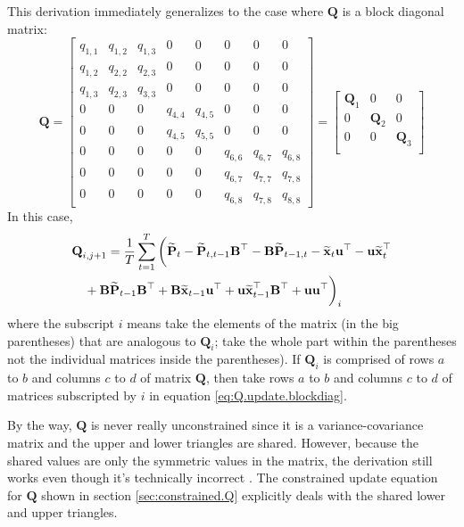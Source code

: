 \documentclass[]{article}
\def\BB{\mbox{$\mathbf B$}}	\def\bb{\mbox{$\mathbf b$}}
\def\PP{\mbox{$\mathbf P$}}  \def\pp{\mbox{$\mathbf p$}}
\def\QQ{\mbox{$\mathbf Q$}}	 \def\qq{\mbox{$\mathbf q$}}
\def\hatxt{\widetilde{\mbox{$\mathbf x$}}_t}
\def\hatxtm{\widetilde{\mbox{$\mathbf x$}}_{t-1}}
\def\hatPt{\widetilde{\PP}_t}
\def\hatPtm{\widetilde{\PP}_{t-1}}
\def\hatPttm{\widetilde{\PP}_{t,t-1}}
\def\hatPtmt{\widetilde{\PP}_{t-1,t}}
\begin{document}
This derivation immediately generalizes to the case where $\QQ$ is a block diagonal matrix:
\begin{equation*}
\QQ =
\begin{bmatrix}
q_{1,1}&q_{1,2}&q_{1,3}&0&0&0&0&0\\
q_{1,2}&q_{2,2}&q_{2,3}&0&0&0&0&0\\
q_{1,3}&q_{2,3}&q_{3,3}&0&0&0&0&0\\
0&0&0&q_{4,4}&q_{4,5}&0&0&0\\
0&0&0&q_{4,5}&q_{5,5}&0&0&0\\
0&0&0&0&0&q_{6,6}&q_{6,7}&q_{6,8}\\
0&0&0&0&0&q_{6,7}&q_{7,7}&q_{7,8}\\
0&0&0&0&0&q_{6,8}&q_{7,8}&q_{8,8}
\end{bmatrix}
=
\begin{bmatrix}
\QQ_1&0&0\\
0&\QQ_2&0\\
0&0&\QQ_3\\
\end{bmatrix}
\end{equation*}
In this case,
\begin{equation}\label{eq:Q.update.blockdiag}
\begin{split}
&\QQ_{i,j+1} = \frac{1}{T}\sum_{t=1}^T \bigg(  
 \hatPt - \hatPttm \BB^\top - \BB\hatPtmt 
 - \hatxt\uu^\top - \uu \hatxt^\top \\
&\quad + \BB\hatPtm\BB^\top + \BB\hatxtm\uu^\top + \uu\hatxtm^\top\BB^\top 
 + \uu\uu^\top \bigg)_i
\end{split}
\end{equation}
where the subscript $i$ means take the elements of the matrix (in the big parentheses) that are analogous to $\QQ_i$; take the whole part within the parentheses not the individual matrices inside the parentheses).  If $\QQ_i$ is comprised of rows $a$ to $b$ and columns $c$ to $d$ of matrix $\QQ$, then take rows $a$ to $b$ and columns $c$ to $d$ of matrices subscripted by $i$ in equation \ref{eq:Q.update.blockdiag}.

By the way, $\QQ$ is never really unconstrained since it is a variance-covariance matrix and the upper and lower triangles are shared.  However, because the shared values are only the symmetric values in the matrix, the derivation still works even though it's technically incorrect \citep{HendersonSearle1979}.  The constrained update equation for $\QQ$ shown in section \ref{sec:constrained.Q} explicitly deals with the shared lower and upper triangles.
\end{document}
